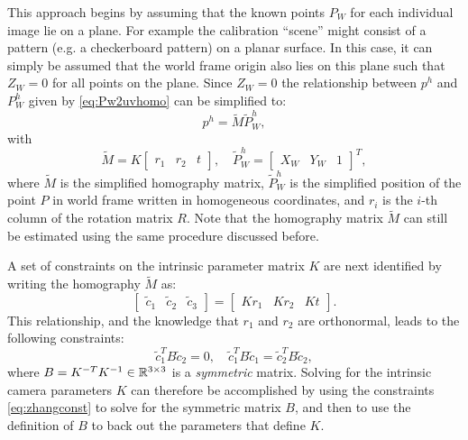 This approach begins by assuming that the known points $P_W$ for each individual image lie on a plane. For example the calibration ``scene'' might consist of a pattern (e.g. a checkerboard pattern) on a planar surface. In this case, it can simply be assumed that the world frame origin also lies on this plane such that $Z_W = 0$ for all points on the plane. Since $Z_W = 0$ the relationship between $p^h$ and $P^h_W$ given by \eqref{eq:Pw2uvhomo} can be simplified to:
\begin{equation}
p^h = \tilde{M} \tilde{P}_W^h,
\end{equation}
with
\begin{equation}
    \tilde{M} = K\begin{bmatrix}
    r_1 & r_2 & t
\end{bmatrix}, \quad \tilde{P}_W^h = \begin{bmatrix}
    X_W & Y_W & 1
\end{bmatrix}^T,
\end{equation}
where $\tilde{M}$ is the simplified homography matrix, $\tilde{P}_W^h$ is the simplified position of the point $P$ in world frame written in homogeneous coordinates, and $r_i$ is the $i$-th column of the rotation matrix $R$. Note that the homography matrix $\tilde{M}$ can still be estimated using the same procedure discussed before.

A set of constraints on the intrinsic parameter matrix $K$ are next identified by writing the homography $\tilde{M}$ as:
\begin{equation*}
    \begin{bmatrix}
        \tilde{c}_1 & \tilde{c}_2 & \tilde{c}_3
        \end{bmatrix} = \begin{bmatrix}
        Kr_1 & Kr_2 & Kt
    \end{bmatrix}.
\end{equation*}
This relationship, and the knowledge that $r_1$ and $r_2$ are orthonormal, leads to the following constraints:
\begin{equation} \label{eq:zhangconst}
    \tilde{c}_1^T B \tilde{c}_2 = 0, \quad \tilde{c}_1^T B \tilde{c}_1 = \tilde{c}_2^T B \tilde{c}_2,
\end{equation}
where $B = K^{-T}K^{-1} \in \mathbb{R}^{3 \times 3}$ is a \textit{symmetric} matrix. Solving for the intrinsic camera parameters $K$ can therefore be accomplished by using the constraints \eqref{eq:zhangconst} to solve for the symmetric matrix $B$, and then to use the definition of $B$ to back out the parameters that define $K$.


